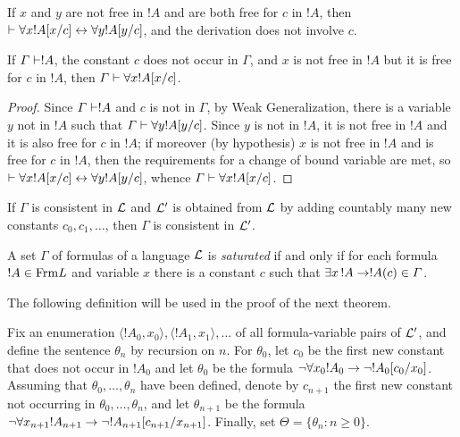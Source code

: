 \documentclass[open-logic-section]{subfiles}
\begin{document}

\begin{prop}
If $x$ and $y$ are not free in $!A$ and are both free for $c$ in $!A$, 
then $\Proves \lforall[x] !A[x/c] \liff \lforall[y] !A[y/c]$, and the derivation 
does not involve $c$.
\end{prop}

\begin{thm}
If $\Gamma \Proves !A$, the constant $c$ does not occur in $\Gamma$, 
and $x$ is not free in $!A$ but it is free for $c$ in $!A$, then $\Gamma \Proves 
\lforall[x] !A[x/c]$.
\end{thm}

\begin{proof}
Since $\Gamma \Proves !A$ and $c$ is not in $\Gamma$, by Weak Generalization, 
there is a variable $y$ not in $!A$ such that $\Gamma \Proves \lforall[y] !A [y/c]$. 
Since $y$ is not in $!A$, it is not free in $!A$ and it is also free for $c$ in $!A$; if 
moreover (by hypothesis) $x$ is not free in $!A$ and is free for $c$ in $!A$, then 
the requirements for a change of bound variable are met, so $\Proves \lforall[x] 
!A[x/c] \liff \lforall[y] !A[y/c]$, whence $\Gamma \Proves \lforall[x] !A[x/c]$.
\end{proof}

\begin{lem}
If $\Gamma$ is consistent in $\mathcal L$ and $\mathcal L'$ is obtained from $\mathcal L$ 
by adding countably many new constants $c_0, c_1, \dots$, then $\Gamma$ is 
consistent in $\mathcal L'$.
\end{lem}

\begin{defn}
  A set $\Gamma$ of formulas of a language $\mathcal {L}$ is
  \emph{saturated} if and only if for each formula $!A \in
  \Frm {L}$ and variable $x$ there is a constant $c$ such that
  $\lexists[x][!A] \lif !A(c) \in \Gamma$.
\end{defn}


The following definition will be used in the proof of the next theorem.

\begin{defn}
Fix an enumeration $\langle !A_0, x_0 \rangle, \langle !A_1, x_1 \rangle, \dots$ of all formula-variable pairs of $\mathcal L'$, and define the sentence $\theta_n$ by recursion on $n$. For $\theta_0$, let $c_0$ be the first new constant that does not occur in $!A_0$ and let $\theta_0$ be the formula $\lnot \lforall[x_0] !A_0 \lif \lnot !A_0[c_0/x_0]$. Assuming that $\theta_0, \dots, \theta_n$ have been defined, denote by $c_{n+1}$ the first new constant not occurring in $\theta_0, \dots, \theta_n$, and let $\theta_{n+1}$ be the formula $\lnot \lforall[x_{n+1}] !A_{n+1} \lif \lnot !A_{n+1}[c_{n+1}/x_{n+1}]$. Finally, set $\Theta = \{ \theta_n : n \geq 0 \}$. 
\end{defn}
\end{document}

